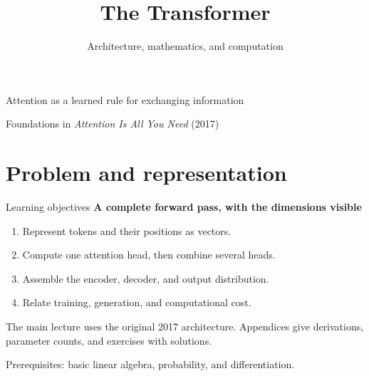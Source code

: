 \documentclass[aspectratio=169,11pt]{beamer}
\title{The Transformer}
\subtitle{Architecture, mathematics, and computation}
\author{}
\date{}
\newcommand{\lead}[1]{{\color{ink}\bfseries #1}\par\vspace{1.2mm}}
\newcommand{\src}[1]{\par\vfill{\fontsize{7}{8.5}\selectfont\color{muted}#1}\par}
\begin{document}
\begin{frame}[plain]
  \vspace{8mm}\titlepage\vspace{-9mm}
  \begin{center}
    \large Attention as a learned rule for exchanging information
  \end{center}
  \vfill
  {\small\color{muted}Foundations in \emph{Attention Is All You Need} (2017)}
\end{frame}

\section{Problem and representation}
\begin{frame}[t]{Learning objectives}
\lead{A complete forward pass, with the dimensions visible}
\begin{enumerate}
  \item Represent tokens and their positions as vectors.
  \item Compute one attention head, then combine several heads.
  \item Assemble the encoder, decoder, and output distribution.
  \item Relate training, generation, and computational cost.
\end{enumerate}
\vspace{2mm}
The main lecture uses the original 2017 architecture. Appendices give
derivations, parameter counts, and exercises with solutions.
\src{Prerequisites: basic linear algebra, probability, and differentiation.}
\end{frame}
\end{document}
